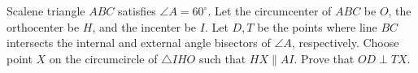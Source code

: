 Scalene triangle $ABC$ satisfies $\angle{A}=60^\circ$. Let the circumcenter of $ABC$ be $O$, the orthocenter be $H$, and the incenter be $I$. Let $D,T$ be the points where line $BC$ intersects the internal and external angle bisectors of $\angle{A}$, respectively. Choose point $X$ on the circumcircle of $\triangle{IHO}$ such that $HX\parallel AI$. Prove that $OD\perp TX$.